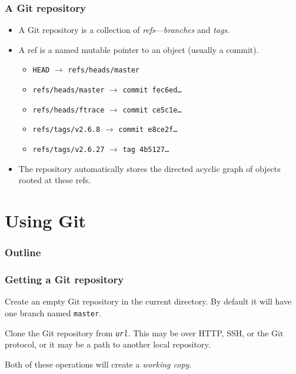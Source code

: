 \documentclass{beamer}
\begin{document}
\begin{frame}
  \frametitle{A Git repository}
  \begin{itemize}
  \item A Git repository is a collection of
    \emph{refs}---\emph{branches} and \emph{tags}.
  \item A ref is a named mutable pointer to an object (usually a
    commit).
    \begin{itemize}
    \item \texttt{HEAD} $\to$ \texttt{refs/heads/master}
    \item \texttt{refs/heads/master} $\to$ \texttt{commit fec6ed\ldots}
    \item \texttt{refs/heads/ftrace} $\to$ \texttt{commit ce5c1e\ldots}
    \item \texttt{refs/tags/v2.6.8} $\to$ \texttt{commit e8ce2f\ldots}
    \item \texttt{refs/tags/v2.6.27} $\to$ \texttt{tag 4b5127\ldots}
    \end{itemize}
  \item The repository automatically stores the directed acyclic graph
    of objects rooted at these refs.
  \end{itemize}
\end{frame}

\section{Using Git}

\begin{frame}
  \frametitle{Outline}
  \tableofcontents[currentsection]
\end{frame}

\begin{frame}
  \frametitle{Getting a Git repository}

  \begin{description}
  \item[\texttt{git init}] Create an empty Git repository in the
    current directory.  By default it will have one branch named
    \texttt{master}.
  \item[\texttt{git clone \textit{url}}] Clone the Git repository from
    \texttt{\textit{url}}.  This may be over HTTP, SSH, or the Git
    protocol, or it may be a path to another local repository.
  \end{description}

  Both of these operations will create a \emph{working copy}.
\end{frame}
\end{document}
